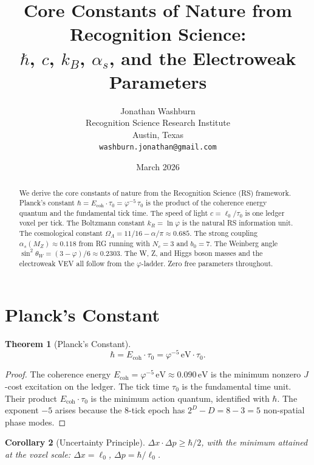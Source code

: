 \documentclass[12pt,a4paper]{article}
\title{Core Constants of Nature from Recognition Science:\\
$\hbar$, $c$, $k_B$, $\alpha_s$, and the Electroweak Parameters}
\author{Jonathan Washburn\\
Recognition Science Research Institute\\
Austin, Texas\\
\texttt{washburn.jonathan@gmail.com}}
\date{March 2026}
\newtheorem{theorem}{Theorem}[section]
\newtheorem{corollary}[theorem]{Corollary}
\theoremstyle{definition}
\theoremstyle{remark}
\begin{document}
\maketitle

\begin{abstract}
We derive the core constants of nature from the Recognition
Science (RS) framework.  Planck's constant
$\hbar = E_{\mathrm{coh}} \cdot \tau_0 = \varphi^{-5}\,\tau_0$
is the product of the coherence energy quantum and the fundamental
tick time.  The speed of light $c = \ell_0/\tau_0$ is one ledger
voxel per tick.  The Boltzmann constant $k_R = \ln\varphi$ is the
natural RS information unit.  The cosmological constant
$\Omega_\Lambda = 11/16 - \alpha/\pi \approx 0.685$.  The strong
coupling $\alpha_s(M_Z) \approx 0.118$ from RG running with
$N_c = 3$ and $b_0 = 7$.  The Weinberg angle
$\sin^2\theta_W = (3 - \varphi)/6 \approx 0.2303$.  The W, Z,
and Higgs boson masses and the electroweak VEV all follow from
the $\varphi$-ladder.  Zero free parameters throughout.
\end{abstract}

\section{Planck's Constant}
\label{sec:hbar}

\begin{theorem}[Planck's Constant]
\label{thm:hbar}
\begin{equation}
  \boxed{\hbar = E_{\mathrm{coh}} \cdot \tau_0
  = \varphi^{-5}\,\mathrm{eV} \cdot \tau_0.}
\end{equation}
\end{theorem}

\begin{proof}
The coherence energy $E_{\mathrm{coh}} = \varphi^{-5}\,\mathrm{eV}
\approx 0.090\,\mathrm{eV}$ is the minimum nonzero $J$-cost
excitation on the ledger.  The tick time $\tau_0$ is the
fundamental time unit.  Their product $E_{\mathrm{coh}} \cdot
\tau_0$ is the minimum action quantum, identified with $\hbar$.
The exponent $-5$ arises because the 8-tick epoch has
$2^D - D = 8 - 3 = 5$ non-spatial phase modes.
\end{proof}

\begin{corollary}[Uncertainty Principle]
$\Delta x \cdot \Delta p \geq \hbar/2$, with the minimum
attained at the voxel scale: $\Delta x = \ell_0$,
$\Delta p = \hbar/\ell_0$.
\end{corollary}
\end{document}
